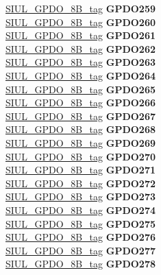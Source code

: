 \begin{DoxyCompactItemize}
\begin{tabbing}
\>\>\mbox{\hyperlink{unionSIUL__GPDO__8B__tag}{SIUL\_GPDO\_8B\_tag}} {\bfseries GPDO259}\\
\>\>\mbox{\hyperlink{unionSIUL__GPDO__8B__tag}{SIUL\_GPDO\_8B\_tag}} {\bfseries GPDO260}\\
\>\>\mbox{\hyperlink{unionSIUL__GPDO__8B__tag}{SIUL\_GPDO\_8B\_tag}} {\bfseries GPDO261}\\
\>\>\mbox{\hyperlink{unionSIUL__GPDO__8B__tag}{SIUL\_GPDO\_8B\_tag}} {\bfseries GPDO262}\\
\>\>\mbox{\hyperlink{unionSIUL__GPDO__8B__tag}{SIUL\_GPDO\_8B\_tag}} {\bfseries GPDO263}\\
\>\>\mbox{\hyperlink{unionSIUL__GPDO__8B__tag}{SIUL\_GPDO\_8B\_tag}} {\bfseries GPDO264}\\
\>\>\mbox{\hyperlink{unionSIUL__GPDO__8B__tag}{SIUL\_GPDO\_8B\_tag}} {\bfseries GPDO265}\\
\>\>\mbox{\hyperlink{unionSIUL__GPDO__8B__tag}{SIUL\_GPDO\_8B\_tag}} {\bfseries GPDO266}\\
\>\>\mbox{\hyperlink{unionSIUL__GPDO__8B__tag}{SIUL\_GPDO\_8B\_tag}} {\bfseries GPDO267}\\
\>\>\mbox{\hyperlink{unionSIUL__GPDO__8B__tag}{SIUL\_GPDO\_8B\_tag}} {\bfseries GPDO268}\\
\>\>\mbox{\hyperlink{unionSIUL__GPDO__8B__tag}{SIUL\_GPDO\_8B\_tag}} {\bfseries GPDO269}\\
\>\>\mbox{\hyperlink{unionSIUL__GPDO__8B__tag}{SIUL\_GPDO\_8B\_tag}} {\bfseries GPDO270}\\
\>\>\mbox{\hyperlink{unionSIUL__GPDO__8B__tag}{SIUL\_GPDO\_8B\_tag}} {\bfseries GPDO271}\\
\>\>\mbox{\hyperlink{unionSIUL__GPDO__8B__tag}{SIUL\_GPDO\_8B\_tag}} {\bfseries GPDO272}\\
\>\>\mbox{\hyperlink{unionSIUL__GPDO__8B__tag}{SIUL\_GPDO\_8B\_tag}} {\bfseries GPDO273}\\
\>\>\mbox{\hyperlink{unionSIUL__GPDO__8B__tag}{SIUL\_GPDO\_8B\_tag}} {\bfseries GPDO274}\\
\>\>\mbox{\hyperlink{unionSIUL__GPDO__8B__tag}{SIUL\_GPDO\_8B\_tag}} {\bfseries GPDO275}\\
\>\>\mbox{\hyperlink{unionSIUL__GPDO__8B__tag}{SIUL\_GPDO\_8B\_tag}} {\bfseries GPDO276}\\
\>\>\mbox{\hyperlink{unionSIUL__GPDO__8B__tag}{SIUL\_GPDO\_8B\_tag}} {\bfseries GPDO277}\\
\>\>\mbox{\hyperlink{unionSIUL__GPDO__8B__tag}{SIUL\_GPDO\_8B\_tag}} {\bfseries GPDO278}\\

\end{tabbing}
\end{DoxyCompactItemize}
